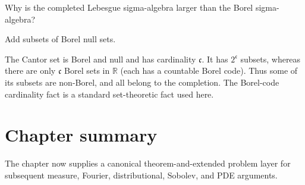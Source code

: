 \begin{exercise}\label{exr:iii01-expand-16}
Why is the completed Lebesgue sigma-algebra larger than the Borel sigma-algebra?
\end{exercise}
\begin{hint}
Add subsets of Borel null sets.
\end{hint}
\begin{solution}
The Cantor set is Borel and null and has cardinality $\mathfrak c$. It has $2^{\mathfrak c}$ subsets, whereas there are only $\mathfrak c$ Borel sets in $\mathbb R$ (each has a countable Borel code). Thus some of its subsets are non-Borel, and all belong to the completion. The Borel-code cardinality fact is a standard set-theoretic fact used here.
\end{solution}
\section*{Chapter summary}
The chapter now supplies a canonical theorem-and-extended problem layer for subsequent measure, Fourier, distributional, Sobolev, and PDE arguments.
